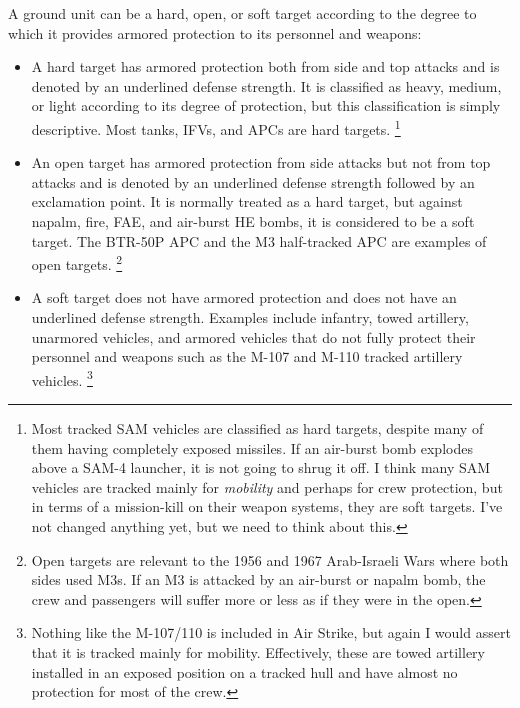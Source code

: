 \documentclass[10pt]{article}
\newcommand{\note}[1]{%
    \footnote{%
        \setlength{\parindent}{0pt}%
        \setlength{\parskip}{\smallskipamount}%
        #1
    }%
}
\begin{document}
A ground unit can be a hard, open, or soft target according to the degree to which it provides armored protection to its personnel and weapons:
\begin{itemize}

    \item A hard target has armored protection both from side and top attacks and is denoted by an underlined defense strength. It is classified as heavy, medium, or light according to its degree of protection, but this classification is simply descriptive. Most tanks, IFVs, and APCs are hard targets.%
        \note{
            Most tracked SAM vehicles are classified as hard targets, despite many of them having completely exposed missiles. If an air-burst bomb explodes above a SAM-4 launcher, it is not going to shrug it off. I think many SAM vehicles are tracked mainly for \emph{mobility} and perhaps for crew protection, but in terms of a mission-kill on their weapon systems, they are soft targets. I've not changed anything yet, but we need to think about this.
        }

    \item An open target has armored protection from side attacks but not from top attacks and is denoted by an underlined defense strength followed by an exclamation point. It is normally treated as a hard target, but against napalm, fire, FAE, and air-burst HE bombs, it is considered to be a soft target. The BTR-50P APC and the M3 half-tracked APC are examples of open targets.%
        \note{
            Open targets are relevant to the 1956 and 1967 Arab-Israeli Wars where both sides used M3s. If an M3 is attacked by an air-burst or napalm bomb, the crew and passengers will suffer more or less as if they were in the open.
        }

    \item A soft target does not have armored protection and does not have an underlined defense strength. Examples include infantry, towed artillery, unarmored vehicles, and armored vehicles that do not fully protect their personnel and weapons such as the M-107 and M-110 tracked artillery vehicles.%
        \note{
            Nothing like the M-107/110 is included in Air Strike, but again I would assert that it is tracked mainly for mobility. Effectively, these are towed artillery installed in an exposed position on a tracked hull and have almost no protection for most of the crew.
        }

\end{itemize}
\end{document}
